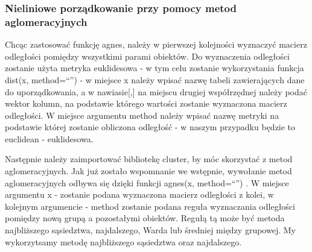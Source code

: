 \documentclass[12pt,a4paper]{report}
\begin{document}
{\begin{Shaded}
\begin{Highlighting}[]
\end{Highlighting}
\end{Shaded}

\subsubsection{Nieliniowe porządkowanie przy pomocy metod
aglomeracyjnych}\label{nieliniowe-porzadkowanie-przy-pomocy-metod-aglomeracyjnych}

Chcąc zastosować funkcję agnes, należy w pierwszej kolejności wyznaczyć
macierz odległości pomiędzy wszystkimi parami obiektów. Do wyznaczenia
odległości zostanie użyta metryka euklidesowa - w tym celu zostanie
wykorzystania funkcja dist(x, method=``'') - w miejsce x należy wpisać
nazwę tabeli zawierających dane do uporządkowania, a w nawiasie{[},{]}
na miejscu drugiej współrzędnej należy podać wektor kolumn, na podstawie
którego wartości zostanie wyznaczona macierz odległości. W miejsce
argumentu method należy wpisać nazwę metryki na podstawie której zostanie
obliczona odległość - w naszym przypadku będzie to euclidean -
euklidesowa.

\begin{Shaded}
\begin{Highlighting}[]
\StringTok{ }\NormalTok{(dane_porzadkowanie[,}\NormalTok{(}\NormalTok{,}\NormalTok{,}
            \NormalTok{,}\NormalTok{,}\NormalTok{)],                                           } \NormalTok{)}
\end{Highlighting}
\end{Shaded}

Następnie należy zaimportować bibliotekę cluster, by móc skorzystać z
metod aglomeracyjnych. Jak już zostało wspomnanie we wstępnie, wywołanie
metod aglomeracyjnych odbywa się dzięki funkcji agnes(x, method=``'') .
W miejsce argumentu x - zostanie podana wyznaczona macierz odległości z
kolei, w kolejnym argumencie - method zostanie podana reguła wyznaczania
odległości pomiędzy nową grupą a pozostałymi obiektów. Regułą tą może
być metoda najbliższego sąsiedztwa, najdalszego, Warda lub średniej
między grupowej. My wykorzytsamy metodę najbliższego sąsiedztwa oraz
najdalszego.

}
\end{document}
